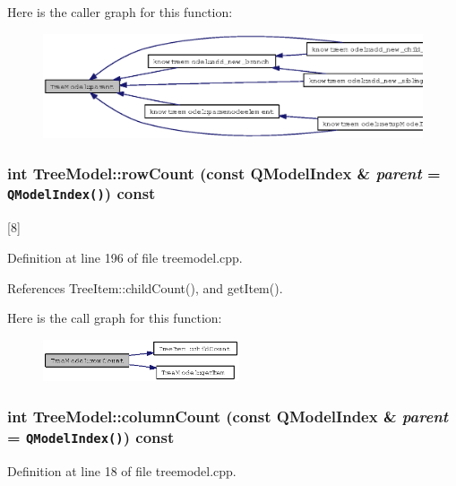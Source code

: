 Here is the caller graph for this function:\begin{figure}[H]
\begin{center}
\leavevmode
\includegraphics[width=325pt]{classTreeModel_d29cef85c6bb0db25fb3d5b844c22e94_icgraph}
\end{center}
\end{figure}
\subsubsection{\setlength{\rightskip}{0pt plus 5cm}int Tree\-Model::row\-Count (const QModel\-Index \& {\em parent} = {\tt QModelIndex()}) const}\label{classTreeModel_a741dd31a085f8a2495fc1d7feb50226}


[8] 



Definition at line 196 of file treemodel.cpp.

References Tree\-Item::child\-Count(), and get\-Item().

Here is the call graph for this function:\begin{figure}[H]
\begin{center}
\leavevmode
\includegraphics[width=164pt]{classTreeModel_a741dd31a085f8a2495fc1d7feb50226_cgraph}
\end{center}
\end{figure}
\subsubsection{\setlength{\rightskip}{0pt plus 5cm}int Tree\-Model::column\-Count (const QModel\-Index \& {\em parent} = {\tt QModelIndex()}) const}\label{classTreeModel_7c23a1d2d39fb76e3d28aa9a0a6f365a}




Definition at line 18 of file treemodel.cpp.

